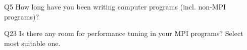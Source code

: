 \begin{description}%
\item{Q5} How long have you been writing computer programs (incl. non-MPI programs)?%
\item{Q23} Is there any room for performance tuning in your MPI programs? Select most suitable one.%
\end{description}%
